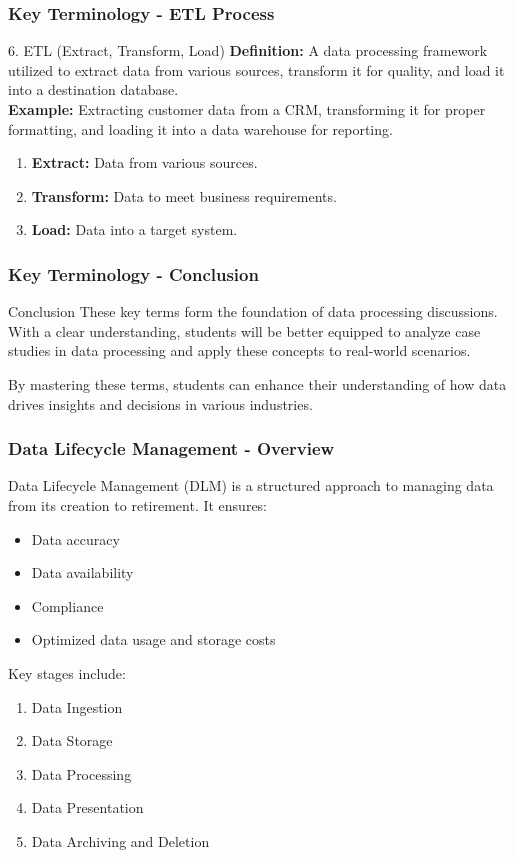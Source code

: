 \documentclass[aspectratio=169]{beamer}
\begin{document}
\begin{frame}[fragile]
    \frametitle{Key Terminology - ETL Process}
    \begin{block}{6. ETL (Extract, Transform, Load)}
        \textbf{Definition:} A data processing framework utilized to extract data from various sources, transform it for quality, and load it into a destination database. \\
        \textbf{Example:} Extracting customer data from a CRM, transforming it for proper formatting, and loading it into a data warehouse for reporting.
    \end{block}

    \begin{enumerate}
        \item \textbf{Extract:} Data from various sources.
        \item \textbf{Transform:} Data to meet business requirements.
        \item \textbf{Load:} Data into a target system.
    \end{enumerate}
\end{frame}

\begin{frame}[fragile]
    \frametitle{Key Terminology - Conclusion}
    \begin{block}{Conclusion}
        These key terms form the foundation of data processing discussions. 
        With a clear understanding, students will be better equipped to analyze case studies in data processing and apply these concepts to real-world scenarios.
        
        By mastering these terms, students can enhance their understanding of how data drives insights and decisions in various industries.
    \end{block}
\end{frame}

\begin{frame}[fragile]
    \frametitle{Data Lifecycle Management - Overview}
    Data Lifecycle Management (DLM) is a structured approach to managing data from its creation to retirement. 
    It ensures:
    \begin{itemize}
        \item Data accuracy
        \item Data availability
        \item Compliance
        \item Optimized data usage and storage costs
    \end{itemize}
    Key stages include:
    \begin{enumerate}
        \item Data Ingestion
        \item Data Storage
        \item Data Processing
        \item Data Presentation
        \item Data Archiving and Deletion
    \end{enumerate}
\end{frame}
\end{document}
